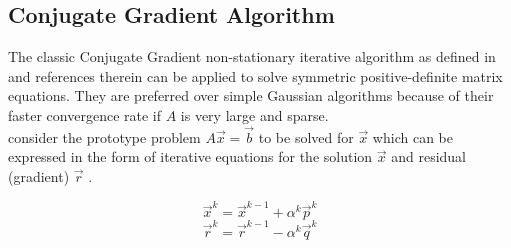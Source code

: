 \subsection{Conjugate Gradient Algorithm}
The classic Conjugate Gradient non-stationary iterative algorithm as defined in \cite{dongarra1991solving} and references therein can be applied to solve symmetric positive-definite matrix equations. They are preferred over simple Gaussian algorithms because of their faster convergence rate if $A$ is very large and sparse.
\\
consider the prototype problem $A \vec{x} = \vec{b}$ to be solved for $\vec{x}$ which can be expressed in the form of iterative equations for the solution $\vec{x}$ and residual (gradient) $\vec{r}$ \cite{hawick1995conjugate}. 

\begin{equation}
\vec{x}^{k} = \vec{x}^{k-1} +\alpha^{k} \vec{p}^{k}
\label{eq:CGx}
\end{equation}
\begin{equation}
\vec{r}^{k} = \vec{r}^{k-1} -\alpha^{k} \vec{q}^{k}
\label{eq:CGr}
\end{equation}


